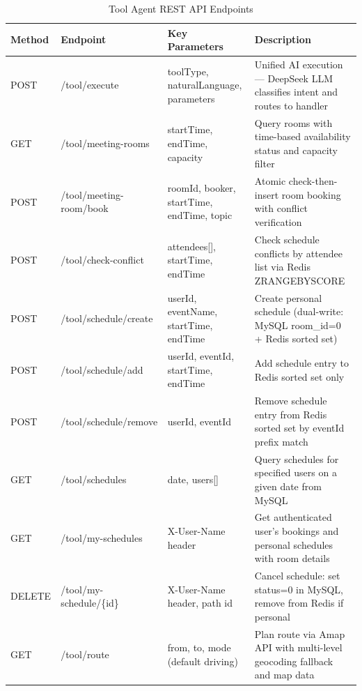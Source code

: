 \begin{table}[H]
\small\singlespacing
\centering
\caption{Tool Agent REST API Endpoints}
\label{tab:tool-agent-api}
\vspace{2mm}

{\small\renewcommand{\arraystretch}{0.92}
\begin{tabular}{@{}p{1.5cm}p{3.5cm}p{4cm}p{\dimexpr\textwidth-9cm-6\tabcolsep\relax}@{}}
\toprule
\textbf{Method} & \textbf{Endpoint} & \textbf{Key Parameters} & \textbf{Description} \\
\midrule
POST   & /tool/execute          & toolType, naturalLanguage, parameters & Unified AI execution --- DeepSeek LLM classifies intent and routes to handler \\
GET    & /tool/meeting-rooms    & startTime, endTime, capacity         & Query rooms with time-based availability status and capacity filter \\
POST   & /tool/meeting-room/book & roomId, booker, startTime, endTime, topic & Atomic check-then-insert room booking with conflict verification \\
POST   & /tool/check-conflict   & attendees[], startTime, endTime      & Check schedule conflicts by attendee list via Redis ZRANGEBYSCORE \\
POST   & /tool/schedule/create  & userId, eventName, startTime, endTime & Create personal schedule (dual-write: MySQL room\_id=0 + Redis sorted set) \\
POST   & /tool/schedule/add     & userId, eventId, startTime, endTime  & Add schedule entry to Redis sorted set only \\
POST   & /tool/schedule/remove  & userId, eventId                      & Remove schedule entry from Redis sorted set by eventId prefix match \\
GET    & /tool/schedules        & date, users[]                        & Query schedules for specified users on a given date from MySQL \\
GET    & /tool/my-schedules     & X-User-Name header                   & Get authenticated user's bookings and personal schedules with room details \\
DELETE & /tool/my-schedule/\{id\} & X-User-Name header, path id          & Cancel schedule: set status=0 in MySQL, remove from Redis if personal \\
GET    & /tool/route            & from, to, mode (default driving)     & Plan route via Amap API with multi-level geocoding fallback and map data \\
\bottomrule
\end{tabular}
}
\end{table}


